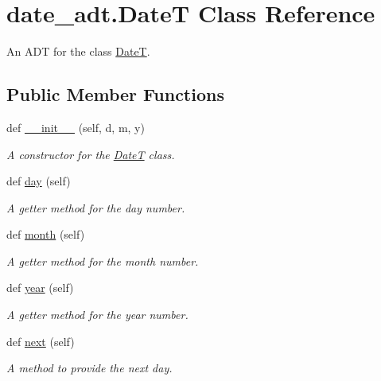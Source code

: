 \hypertarget{classdate__adt_1_1_date_t}{}\section{date\+\_\+adt.\+DateT Class Reference}
\label{classdate__adt_1_1_date_t}


An A\+DT for the class \hyperlink{classdate__adt_1_1_date_t}{DateT}.  


\subsection*{Public Member Functions}
\begin{DoxyCompactItemize}
\item 
def \hyperlink{classdate__adt_1_1_date_t_a3ad842fd23b8c4a1f9e65a426d50e3b2}{\+\_\+\+\_\+init\+\_\+\+\_\+} (self, d, m, y)
\begin{DoxyCompactList}\small\item\em A constructor for the \hyperlink{classdate__adt_1_1_date_t}{DateT} class. \end{DoxyCompactList}\item 
def \hyperlink{classdate__adt_1_1_date_t_a8ccbd5257d8a6e79fc67fd6ce6b88766}{day} (self)
\begin{DoxyCompactList}\small\item\em A getter method for the day number. \end{DoxyCompactList}\item 
def \hyperlink{classdate__adt_1_1_date_t_aad0e41fc53976c15837be62d0f5cbbbf}{month} (self)
\begin{DoxyCompactList}\small\item\em A getter method for the month number. \end{DoxyCompactList}\item 
def \hyperlink{classdate__adt_1_1_date_t_a29a9e1387bbdf0b7d9b36a0d940fd1cc}{year} (self)
\begin{DoxyCompactList}\small\item\em A getter method for the year number. \end{DoxyCompactList}\item 
def \hyperlink{classdate__adt_1_1_date_t_a9d77bfd2612084a826385017cc9d91e7}{next} (self)
\begin{DoxyCompactList}\small\item\em A method to provide the next day. \end{DoxyCompactList}\item 

\end{DoxyCompactItemize}
